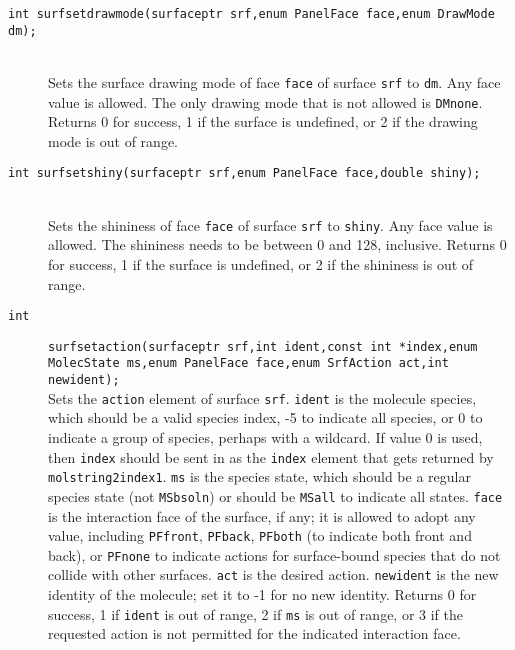 \documentclass {book}
\begin{document}
\begin{description}
\item[\texttt{int surfsetdrawmode(surfaceptr srf,enum PanelFace face,enum DrawMode dm);}]
\hfill \\
Sets the surface drawing mode of face \texttt{face} of surface \texttt{srf} to \texttt{dm}. Any face value is allowed. The only drawing mode that is not allowed is \texttt{DMnone}. Returns 0 for success, 1 if the surface is undefined, or 2 if the drawing mode is out of range.

\item[\texttt{int surfsetshiny(surfaceptr srf,enum PanelFace face,double shiny);}]
\hfill \\
Sets the shininess of face \texttt{face} of surface \texttt{srf} to \texttt{shiny}. Any face value is allowed. The shininess needs to be between 0 and 128, inclusive. Returns 0 for success, 1 if the surface is undefined, or 2 if the shininess is out of range.

\item[\texttt{int}]
\texttt{surfsetaction(surfaceptr srf,int ident,const int *index,enum MolecState ms,enum PanelFace face,enum SrfAction act,int newident);}
\hfill \\
Sets the \texttt{action} element of surface \texttt{srf}. \texttt{ident} is the molecule species, which should be a valid species index, -5 to indicate all species, or 0 to indicate a group of species, perhaps with a wildcard. If value 0 is used, then \texttt{index} should be sent in as the \texttt{index} element that gets returned by \texttt{molstring2index1}. \texttt{ms} is the species state, which should be a regular species state (not \texttt{MSbsoln}) or should be \texttt{MSall} to indicate all states. \texttt{face} is the interaction face of the surface, if any; it is allowed to adopt any value, including \texttt{PFfront}, \texttt{PFback}, \texttt{PFboth} (to indicate both front and back), or \texttt{PFnone} to indicate actions for surface-bound species that do not collide with other surfaces. \texttt{act} is the desired action. \texttt{newident} is the new identity of the molecule; set it to -1 for no new identity. Returns 0 for success, 1 if \texttt{ident} is out of range, 2 if \texttt{ms} is out of range, or 3 if the requested action is not permitted for the indicated interaction face.


\end{description}
\end{document}
